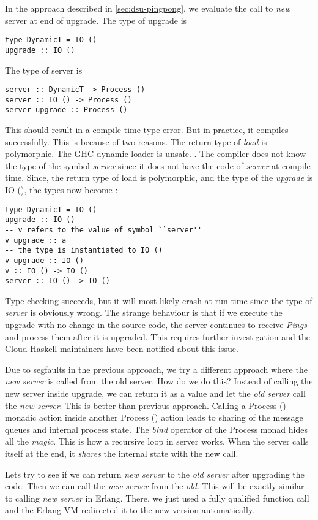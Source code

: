 In the approach described in \autoref{sec:dsu-pingpong}, we evaluate the
call to \emph{new} server at end of upgrade. The type of upgrade is
\begin{verbatim}
type DynamicT = IO ()
upgrade :: IO ()
\end{verbatim}
The type of server is
\begin{verbatim}
server :: DynamicT -> Process ()
server :: IO () -> Process ()
server upgrade :: Process ()
\end{verbatim}
This should result in a compile time type error. But in practice, it
compiles successfully. This is because of two reasons. The return type
of \emph{load} is polymorphic. The GHC dynamic loader
is unsafe. \cite{stewart_dynamic_2010}. The compiler does not know the
type of the symbol \emph{server} since it does not have the code of
\emph{server} at compile time. Since, the return type of load is
polymorphic, and the type of the \emph{upgrade} is IO (), the types
now become :
\begin{verbatim}
type DynamicT = IO ()
upgrade :: IO ()
-- v refers to the value of symbol ``server''
v upgrade :: a
-- the type is instantiated to IO ()
v upgrade :: IO ()
v :: IO () -> IO ()
server :: IO () -> IO ()
\end{verbatim}

Type checking succeeds, but it will most likely crash at run-time
since the type of \emph{server} is obviously wrong.  The strange
behaviour is that if we execute the upgrade with no change in the
source code, the server continues to receive \emph{Pings} and process
them after it is upgraded. This requires further investigation and the
Cloud Haskell maintainers have been notified about this issue.

Due to segfaults in the previous approach, we try a different
approach where the \emph{new server} is called from the old
server. How do we do this? Instead of calling the new server inside
upgrade, we can return it as a value and let the \emph{old server}
call the \emph{new server}.  This is better than previous
approach. Calling a Process () monadic action inside another Process
() action leads to sharing of the message queues and internal process
state. The \emph{bind} operator of the Process monad hides all the
\emph{magic}. This is how a recursive loop in server works. When the
server calls itself at the end, it \emph{shares} the internal state
with the new call.

Lets try to see if we can return \emph{new server} to the \emph{old
  server} after upgrading the code. Then we can call the \emph{new
  server} from the \emph{old}. This will be exactly similar to calling
\emph{new server} in Erlang. There, we just used a fully qualified
function call and the Erlang VM redirected it to the new version
automatically.

